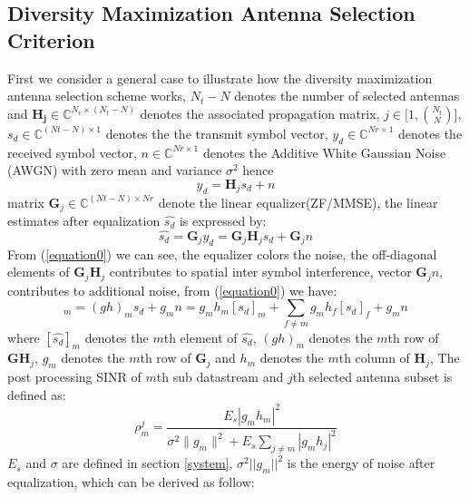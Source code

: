 \documentclass[12pt,a4paper,final]{article}
\begin{document}
\begin{spacing}{2.5}
\section{Diversity Maximization Antenna Selection Criterion}\label{channel partition}
First we consider a general case to illustrate how the diversity maximization antenna selection scheme works,
$N_{t}-N$ denotes the number of selected antennas and $\mathbf{H_{j}}\in \mathbb{C}^{N_{r}\times (N_{t}-N)}$ denotes the associated propagation matrix, $j\in {\displaystyle\biggl[1,{N_{t}\choose N}\biggr]}$, $s_{d}\in \mathbb{C}^{(Nt-N)\times 1}$ denotes the the transmit symbol vector, $y_{d}\in \mathbb{C}^{Nr\times 1}$ denotes the received symbol vector, $n\in \mathbb{C}^{Nr\times 1}$ denotes the Additive White Gaussian Noise (AWGN) with zero mean and variance $\sigma^{2}$ hence
\begin{equation}
y_{d}=\mathbf{H}_{j}s_{d}+n
\end{equation}
matrix $\mathbf{G}_{j}\in \mathbb{C}^{(Nt-N)\times Nr}$ denote the linear equalizer(ZF/MMSE), the linear estimates after equalization $\hat{s_{d}}$ is expressed by:
\begin{equation}
\hat{s_{d}}=\mathbf{G}_{j}y_{d}=\mathbf{G}_{j}\mathbf{H}_{j}s_{d}+\mathbf{G}_{j}n\label{equation0}
\end{equation}
From (\ref{equation0}) we can see, the equalizer colors the noise, the off-diagonal elements of $\mathbf{G}_{j}\mathbf{H}_{j}$ contributes to spatial inter symbol interference, vector $\mathbf{G}_{j}n$, contributes to additional noise, from (\ref{equation0}) we have:
\begin{equation}
[\hat{s_{d}}]_{m}=(gh)_{m}s_{d}+g_{m}n=g_{m}h_{m}[s_{d}]_{m}+\sum_{f\neq m}g_{m}h_{f}[s_{d}]_{f}+g_{m}n\label{equation01}
\end{equation}
where $[\hat{s_{d}}]_{m}$ denotes the $m$th element of $\hat{s_{d}}$, $(gh)_{m}$ denotes the $m$th row of $\mathbf{G}\mathbf{H}_{j}$, $g_{m}$ denotes the $m$th row of $\mathbf{G}_{j}$ and $h_{m}$ denotes the $m$th column of $\mathbf{H}_{j}$, The post processing SINR of $m$th sub datastream and $j$th selected antenna subset is defined as\cite{3}:
\begin{equation}
\rho^{j}_{m}=\frac{E_{s}|g_{m}h_{m}|^{2}}{\sigma^{2}\parallel g_{m}\parallel^{2}+E_{s}\sum_{j\neq m}|g_{m}h_{j}|^{2}}
\end{equation}
$E_{s}$ and $\sigma$ are defined in section \ref{system}, $\sigma^{2}||g_{m}||^{2}$ is the energy of noise after equalization, which can be derived as follow:
\begin{equation}

\end{equation}
\end{spacing}
\end{document}
